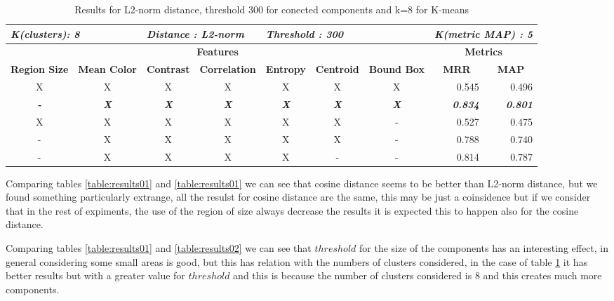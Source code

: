 \begin{table}[H]
\centering
\begin{tabular}{|c|c|c|c|c|c|c|r|r|}
\hline
\multicolumn{2}{|l|}{\textit{\textbf{K(clusters): 8}}} & \multicolumn{2}{l|}{\textit{\textbf{Distance : L2-norm}}} & \multicolumn{3}{l|}{\textit{\textbf{Threshold : 300}}} & \multicolumn{2}{l|}{\textit{\textbf{K(metric MAP) :  5}}} \\ \hline
\multicolumn{7}{|c|}{\textbf{Features}} & \multicolumn{2}{c|}{\textbf{Metrics}} \\ \hline
\textbf{Region Size} & \textbf{Mean Color} & \textbf{Contrast} & \textbf{Correlation} & \textbf{Entropy} & \textbf{Centroid} & \textbf{Bound Box} & \multicolumn{1}{c|}{\textbf{MRR}} & \multicolumn{1}{c|}{\textbf{MAP}} \\ \hline
X & X & X & X & X & X & X & 0.545 & 0.496 \\ \hline
\textit{\textbf{-}} & \textit{\textbf{X}} & \textit{\textbf{X}} & \textit{\textbf{X}} & \textit{\textbf{X}} & \textit{\textbf{X}} & \textit{\textbf{X}} & \textit{\textbf{0.834}} & \textit{\textbf{0.801}} \\ \hline
X & X & X & X & X & X & - & 0.527 & 0.475 \\ \hline
- & X & X & X & X & X & - & 0.788 & 0.740 \\ \hline
- & X & X & X & X & - & - & 0.814 & 0.787 \\ \hline
\end{tabular}
\caption{Results for L2-norm distance, threshold 300 for conected components and k=8 for K-means}
\label{table:results03}
\end{table}

Comparing tables \ref{table:results01} and \ref{table:results01} we can see that cosine distance seems to be better than L2-norm distance, but we found something particularly extrange, all the resulst for cosine distance are the same, this may be just a coinsidence but if we consider that in the rest of expiments, the use of the region of size always decrease the results it is expected this to happen also for the cosine distance.

Comparing tables \ref{table:results01} and \ref{table:results02} we can see that $threshold$ for the size of the components has an interesting effect, in general considering some small areas is good, but this has relation with the numbers of clusters considered, in the case of table \ref{table:results03} it has better results but with a greater value for $threshold$ and this is because the number of clusters considered is 8 and this creates much more components.

